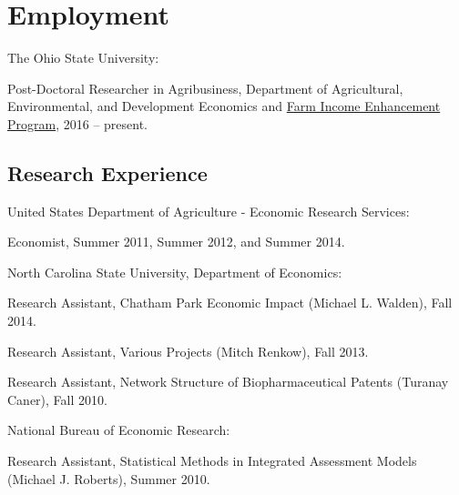 \documentclass[letterpaper]{article}
\renewenvironment{itemize}{
  \begin{list}{}{
    \setlength{\leftmargin}{1.5em}
  }
}{
  \end{list}
}
\begin{document}
\section*{Employment}
\begin{itemize}
\item The Ohio State University:
\begin{itemize}
\item Post-Doctoral Researcher in Agribusiness, Department of Agricultural, Environmental, and Development Economics and \href{http://aede.osu.edu/programs/farm-income-enhancement-program}{Farm Income Enhancement Program}, 2016 -- present.
\end{itemize}
\end{itemize}

\subsection*{Research Experience}

\begin{itemize}
\item United States Department of Agriculture - Economic Research Services:
\begin{itemize}
\item Economist, Summer 2011, Summer 2012, and Summer 2014.
\end{itemize}

\item North Carolina State University, Department of Economics:
\begin{itemize}
\item Research Assistant, Chatham Park Economic Impact (Michael L. Walden), Fall 2014.
\item Research Assistant, Various Projects (Mitch Renkow), Fall 2013.
\item Research Assistant, Network Structure of Biopharmaceutical Patents (Turanay Caner), Fall 2010.
\end{itemize}

\item National Bureau of Economic Research:
\begin{itemize}
\item Research Assistant, Statistical Methods in Integrated Assessment Models (Michael J. Roberts), Summer 2010.
\end{itemize}
\end{itemize}
\end{document}
